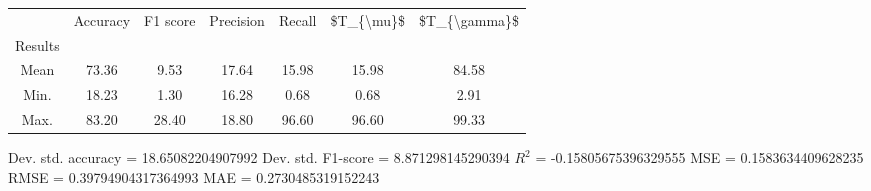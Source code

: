 \begin{tabular}{|c|c|c|c|c|c|c|}
\toprule
{} &  Accuracy &  F1 score &  Precision &  Recall &  \$T\_\{\textbackslash mu\}\$ &  \$T\_\{\textbackslash gamma\}\$ \\
Results &           &           &            &         &            &               \\
\hline
Mean    &     73.36 &      9.53 &      17.64 &   15.98 &      15.98 &         84.58 \\
Min.    &     18.23 &      1.30 &      16.28 &    0.68 &       0.68 &          2.91 \\
Max.    &     83.20 &     28.40 &      18.80 &   96.60 &      96.60 &         99.33 \\
\bottomrule
\end{tabular}

 Dev. std. accuracy = 18.65082204907992
 Dev. std. F1-score = 8.871298145290394
 $R^2$ = -0.15805675396329555
 MSE = 0.1583634409628235
 RMSE = 0.39794904317364993
 MAE = 0.2730485319152243